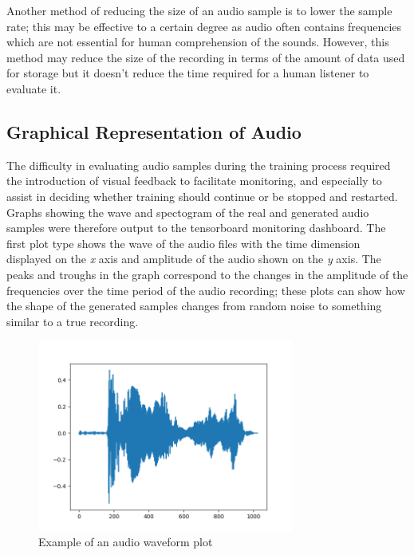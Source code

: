 \documentclass[a4paper, titlepage]{article}
\begin{document}
\newline
\newline
Another method of reducing the size of an audio sample is to lower the sample rate; this may be effective to a certain degree as audio often contains frequencies which are not essential for human comprehension of the sounds.
However, this method may reduce the size of the recording in terms of the amount of data used for storage but it doesn't reduce the time required for a human listener to evaluate it.

\subsection{Graphical Representation of Audio}

The difficulty in evaluating audio samples during the training process required the introduction of visual feedback to facilitate monitoring, and especially to assist in deciding whether training should continue or be stopped and restarted.
Graphs showing the wave and spectogram of the real and generated audio samples were therefore output to the tensorboard monitoring dashboard.
\newline
\newline
The first plot type shows the wave of the audio files with the time dimension displayed on the \textit{x} axis and amplitude of the audio shown on the \textit{y} axis.
The peaks and troughs in the graph correspond to the changes in the amplitude of the frequencies over the time period of the audio recording; these plots can show how the shape of the generated samples changes from random noise to something similar to a true recording.
\newline
\begin{figure}[ht]
  \caption{Example of an audio waveform plot}
  \centering
  \includegraphics[width=0.75\textwidth]{AudioWave}
\end{figure}
\end{document}
